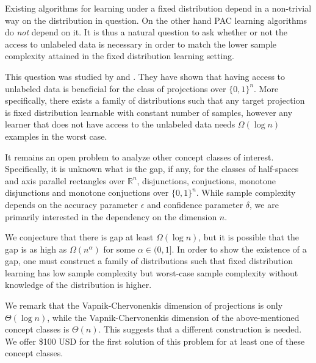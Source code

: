 \documentclass[12pt]{colt2019}
\newcommand{\R}{\mathbb{R}}
\begin{document}
Existing algorithms for learning under a fixed distribution depend in a
non-trivial way on the distribution in question. On the other hand PAC learning
algorithms do \emph{not} depend on it. It is thus a natural question to ask
whether or not the access to unlabeled data is necessary in order to match the
lower sample complexity attained in the fixed distribution learning setting.

This question was studied by \cite{Darnstadt-Simon-Szorenyi-2013} and
\cite{Golovnev-Pal-Szorenyi-2019}. They have shown that having access to
unlabeled data is beneficial for the class of projections over $\{0,1\}^n$. More
specifically, there exists a family of distributions such that any target
projection is fixed distribution learnable with constant number of samples,
however any learner that does not have access to the unlabeled data needs
$\Omega(\log n)$ examples in the worst case.

It remains an open problem to analyze other concept classes of interest.
Specifically, it is unknown what is the gap, if any, for the classes of
half-spaces and axis parallel rectangles over $\R^n$, disjunctions, conjuctions,
monotone disjunctions and monotone conjuctions over $\{0,1\}^n$. While sample
complexity depends on the accuracy parameter $\epsilon$ and confidence parameter
$\delta$, we are primarily interested in the dependency on the dimension $n$.

We conjecture that there is gap at least $\Omega(\log n)$, but it is possible
that the gap is as high as $\Omega(n^\alpha)$ for some $\alpha \in (0,1]$. In
order to show the existence of a gap, one must construct a family of
distributions such that fixed distribution learning has low sample complexity
but worst-case sample complexity without knowledge of the distribution is
higher.

We remark that the Vapnik-Chervonenkis dimension of projections is only
$\Theta(\log n)$, while the Vapnik-Chervonenkis dimension of the above-mentioned
concept classes is $\Theta(n)$.  This suggests that a different construction is
needed. We offer \$100 USD for the first solution of this problem for at least
one of these concept classes.


\end{document}
